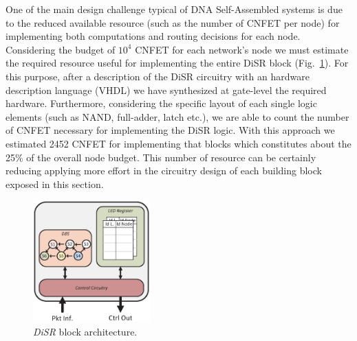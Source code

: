 One of the main design challenge typical of DNA Self-Assembled systems is due to the
reduced available resource (such as the number of CNFET per node) for implementing both 
computations and routing decisions for each node. Considering the budget of $10^4$ CNFET 
for each network's node\cite{liu_jetcs} we must estimate the required resource useful 
for implementing the entire DiSR block (Fig.~\ref{fig:implementation}). For this purpose, 
after a description of the DiSR circuitry with an hardware description language (VHDL) 
we have synthesized at gate-level the required hardware. Furthermore, considering the 
specific layout of each single logic elements (such as NAND, full-adder, latch etc.), 
we are able to count the number of CNFET necessary for implementing the DiSR logic. 
With this approach we estimated 2452 CNFET for implementing that blocks which constitutes 
about the 25\% of the overall node budget. This number of resource can be certainly reducing 
applying more effort in the circuitry design of each building block exposed in this section.

\begin{figure}
  \centering
  \includegraphics[width=0.40\textwidth]{pictures/disr_imp.eps}
  \caption{\emph{DiSR} block architecture.}
 \label{fig:implementation}
\end{figure}
